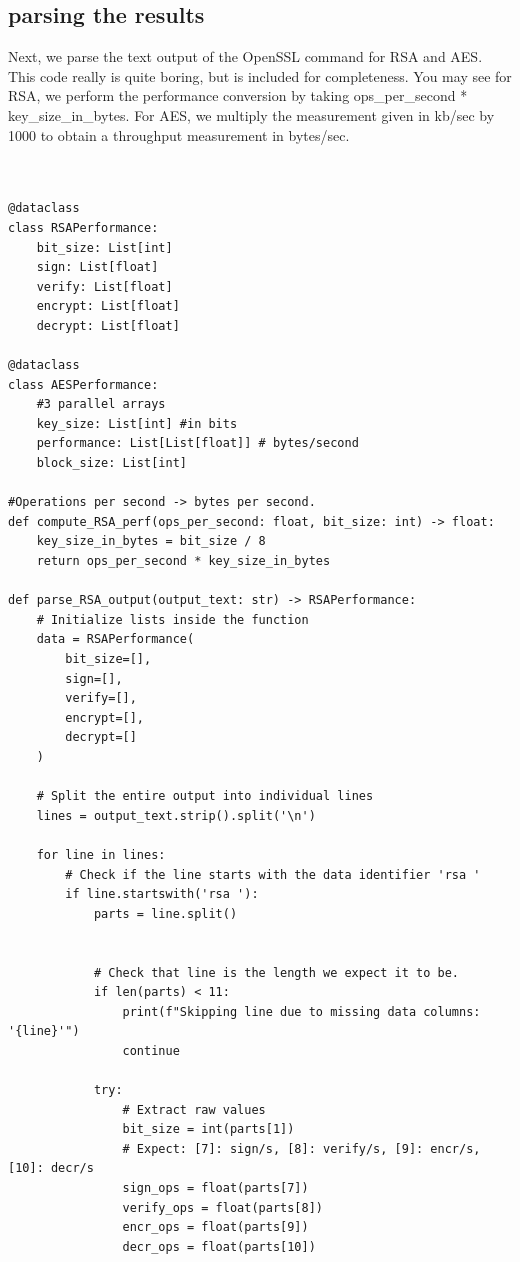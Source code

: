 \documentclass[11pt]{article}
\begin{document}
\subsection*{parsing the results}
Next, we parse the text output of the OpenSSL command for RSA and AES. This code really is quite boring, but is included for completeness. You may see for RSA, we perform the performance conversion by taking ops\_per\_second * key\_size\_in\_bytes. For AES, we multiply the measurement given in kb/sec by 1000 to obtain a throughput measurement in bytes/sec.
\begin{framed}
\begin{verbatim}


@dataclass
class RSAPerformance:
    bit_size: List[int]
    sign: List[float]
    verify: List[float]
    encrypt: List[float]
    decrypt: List[float] 

@dataclass
class AESPerformance:
    #3 parallel arrays
    key_size: List[int] #in bits
    performance: List[List[float]] # bytes/second
    block_size: List[int]

#Operations per second -> bytes per second.
def compute_RSA_perf(ops_per_second: float, bit_size: int) -> float:
    key_size_in_bytes = bit_size / 8
    return ops_per_second * key_size_in_bytes

def parse_RSA_output(output_text: str) -> RSAPerformance:
    # Initialize lists inside the function
    data = RSAPerformance(
        bit_size=[],
        sign=[],
        verify=[],
        encrypt=[],
        decrypt=[]
    )

    # Split the entire output into individual lines
    lines = output_text.strip().split('\n')

    for line in lines:
        # Check if the line starts with the data identifier 'rsa '
        if line.startswith('rsa '):
            parts = line.split()

            
            # Check that line is the length we expect it to be.
            if len(parts) < 11:
                print(f"Skipping line due to missing data columns: '{line}'")
                continue
                 
            try:
                # Extract raw values
                bit_size = int(parts[1])
                # Expect: [7]: sign/s, [8]: verify/s, [9]: encr/s, [10]: decr/s
                sign_ops = float(parts[7])
                verify_ops = float(parts[8])
                encr_ops = float(parts[9])
                decr_ops = float(parts[10])


\end{verbatim}
\end{framed}
\end{document}
